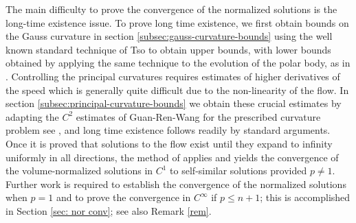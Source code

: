 \documentclass{amsart}
\newtheorem{theorem}{Theorem}
\theoremstyle{definition}
\theoremstyle{remark}
\newtheorem{remark}[theorem]{Remark}
\numberwithin{equation}{section}
\begin{document}
The main difficulty to prove the convergence of the normalized solutions is the long-time existence issue. To prove long time existence, we first obtain bounds on the Gauss curvature in section \ref{subsec:gauss-curvature-bounds} using the well known standard technique of Tso \cite{Tso} to obtain upper bounds, with lower bounds obtained by applying the same technique to the evolution of the polar body, as in \cite{Ivaki-Proc}.  Controlling the principal curvatures requires estimates of higher derivatives of the speed which is generally quite difficult due to the non-linearity of the flow. In section \ref{subsec:principal-curvature-bounds} we obtain these crucial estimates by adapting the $C^2$ estimates of Guan-Ren-Wang for the prescribed curvature problem see \cite[(4.2)]{Guan}, and long time existence follows readily by standard arguments. Once it is proved that solutions to the flow exist until they expand to infinity uniformly in all directions, the method of \cite[Section 8]{Ivaki 2014-gauss} applies and yields the convergence of the volume-normalized solutions in $C^{1}$ to self-similar solutions provided $p\neq1$. Further work is required to establish the convergence of the normalized solutions when $p=1$ and to prove the convergence in $C^{\infty}$ if $p\leq n+1$; this is accomplished in Section \ref{sec: nor conv}; see also Remark \ref{rem}.
\end{document}
